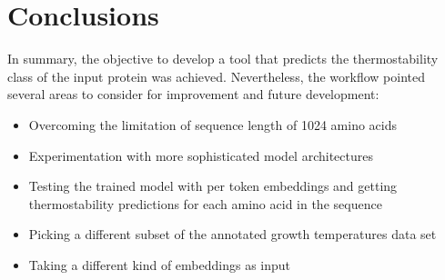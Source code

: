 \documentclass[12pt]{article}
\begin{document}
	\newpage

	\section{Conclusions}

	In summary, the objective to develop a tool that predicts the thermostability
	class of the input protein was achieved. Nevertheless, the workflow pointed
	several areas to consider for improvement and future development:

	\begin{itemize}
		\item Overcoming the limitation of sequence length of 1024 amino acids
		\item Experimentation with more sophisticated model architectures
		\item Testing the trained model with per token embeddings and getting 
			  thermostability predictions for each amino acid in the sequence
		\item Picking a different subset of the annotated growth temperatures 
			  data set  
		\item Taking a different kind of embeddings as input
	\end{itemize}
	
	\nocite{*}
	
	\normalsize

 

\end{document}
